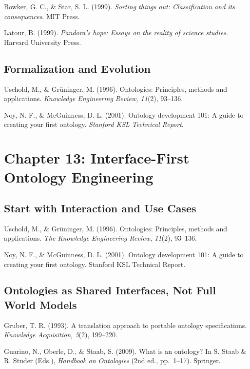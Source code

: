 \documentclass[
  openright]{book}
\begin{document}
Bowker, G. C., \& Star, S. L. (1999). \emph{Sorting things out:
Classification and its consequences}. MIT Press.

Latour, B. (1999). \emph{Pandora's hope: Essays on the reality of
science studies}. Harvard University Press.

\subsection{Formalization and
Evolution}\label{formalization-and-evolution}

Uschold, M., \& Grüninger, M. (1996). Ontologies: Principles, methods
and applications. \emph{Knowledge Engineering Review, 11}(2), 93--136.

Noy, N. F., \& McGuinness, D. L. (2001). Ontology development 101: A
guide to creating your first ontology. \emph{Stanford KSL Technical
Report}.

\section{Chapter 13: Interface-First Ontology
Engineering}\label{chapter-13-interface-first-ontology-engineering-1}

\subsection{Start with Interaction and Use
Cases}\label{start-with-interaction-and-use-cases}

Uschold, M., \& Grüninger, M. (1996). Ontologies: Principles, methods
and applications. \emph{The Knowledge Engineering Review, 11}(2),
93--136.

Noy, N. F., \& McGuinness, D. L. (2001). Ontology development 101: A
guide to creating your first ontology. Stanford KSL Technical Report.

\subsection{Ontologies as Shared Interfaces, Not Full World
Models}\label{ontologies-as-shared-interfaces-not-full-world-models}

Gruber, T. R. (1993). A translation approach to portable ontology
specifications. \emph{Knowledge Acquisition, 5}(2), 199--220.

Guarino, N., Oberle, D., \& Staab, S. (2009). What is an ontology? In S.
Staab \& R. Studer (Eds.), \emph{Handbook on Ontologies} (2nd ed.,
pp.~1--17). Springer.
\end{document}
